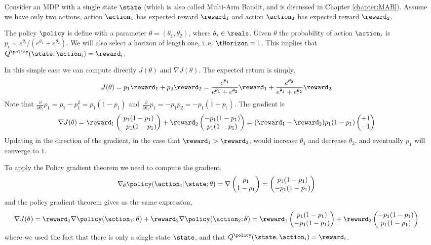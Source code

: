 \begin{example}
Consider an MDP with a single state $\state$ (which is also called
Multi-Arm Bandit, and is discussed in Chapter \ref{chapter:MAB}).
Assume we have only two actions, action $\action_1$ has expected
reward $\reward_1$ and action $\action_2$ has expected reward
$\reward_2$.

The policy $\policy$ is define with a parameter
$\theta=(\theta_1,\theta_2)$, where $\theta_i\in \reals$. Given
$\theta$ the probability of action $\action_i$ is
$p_i=e^{\theta_i}/(e^{\theta_1}+e^{\theta_2})$. We will also select
a horizon of length one, i..e, $\tHorizon=1$. This implies that
$Q^\policy(\state,\action_i)=\reward_i$.

In this simple case we can compute directly $J(\theta)$ and $\nabla
J(\theta)$. The expected return is simply,
\[
J(\theta)=p_1 \reward_1 + p_2 \reward_2 =
\frac{e^{\theta_1}}{e^{\theta_1}+e^{\theta_2}} \reward_1 +
\frac{e^{\theta_2}}{e^{\theta_1}+e^{\theta_2}} \reward_2
\]
Note that $\frac{\partial}{\partial \theta_1} p_1=
p_1-p_1^2=p_1(1-p_1) $ and $\frac{\partial }{\partial \theta_2} p_1=
- p_1 p_2= -p_1(1-p_1)$. The gradient is
\[
\nabla J(\theta)= \reward_1 \begin{pmatrix} p_1(1-p_1)\\
-p_1(1-p_1)\end{pmatrix} + \reward_2 \begin{pmatrix} -p_1(1-p_1)\\
p_1(1-p_1)\end{pmatrix} = (\reward_1-\reward_2) p_1(1-p_1) \begin{pmatrix}+1\\
-1\end{pmatrix}
\]
Updating in the direction of the gradient, in the case that
$\reward_1>\reward_2$, would increase $\theta_1$ and decrease
$\theta_2$, and eventually $p_1$ will converge to $1$.

To apply the Policy gradient theorem we need to compute the
gradient,
\[
\nabla_\theta \policy(\action_1|\state;\theta) = \nabla \begin{pmatrix} p_1\\
1-p_1\end{pmatrix}=  \begin{pmatrix} p_1(1-p_1)\\
-p_1(1-p_1)\end{pmatrix}
\]
and the policy gradient theorem gives us the same expression,
\[
\nabla J(\theta) = \reward_1 \nabla
\policy(\action_1;\theta)+\reward_2 \nabla
\policy(\action_2;\theta)=\reward_1 \begin{pmatrix} p_1(1-p_1)\\
-p_1(1-p_1)\end{pmatrix} + \reward_2 \begin{pmatrix} -p_1(1-p_1)\\
p_1(1-p_1)\end{pmatrix}
\]
where we used the fact that there is only a single state $\state$,
and that $Q^\policy(\state,\action_i)=\reward_i$.
\end{example}

